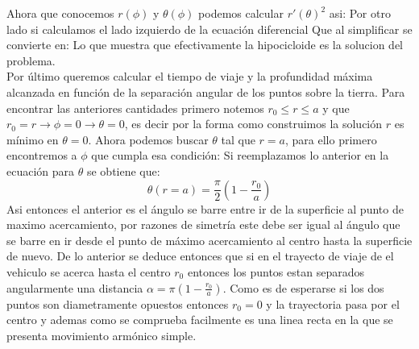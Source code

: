 Ahora que conocemos $r(\phi)$ y $\theta(\phi)$ podemos calcular $r'(\theta)^2$ asi:
Por otro lado si calculamos el lado izquierdo de la ecuaci\'on diferencial 
Que al simplificar se convierte en:
Lo que muestra que efectivamente la hipocicloide es la solucion del problema.
\\
Por \'ultimo queremos calcular el tiempo de viaje y la profundidad m\'axima alcanzada en funci\'on de la separaci\'on angular de los puntos sobre la tierra.
Para encontrar las anteriores cantidades primero notemos $r_0\leq r\leq a$ y que $r_0=r \rightarrow \phi=0 \rightarrow \theta=0$, es decir por la forma como construimos la soluci\'on $r$ es m\'inimo en $\theta=0$. Ahora podemos buscar $\theta$ tal que $r=a$, para ello primero encontremos  a $\phi$ que cumpla esa condici\'on:
Si reemplazamos lo anterior en la ecuaci\'on para $\theta$ se obtiene que:
$$\theta(r=a)=\frac{\pi}{2}\left(1-\frac{r_0}{a}\right)$$
Asi entonces el anterior es el \'angulo se barre entre ir de la superficie al punto de maximo acercamiento, por razones de simetr\'ia este debe ser igual al \'angulo que se barre en ir desde el punto de m\'aximo acercamiento al centro hasta la superficie de nuevo. De lo anterior se deduce entonces que si en el trayecto de viaje de el vehiculo se acerca hasta el centro $r_0$ entonces los puntos estan separados angularmente una distancia $\alpha=\pi \left(1-\frac{r_0}{a}\right)$. Como es de esperarse si los dos puntos son diametramente opuestos entonces $r_0=0$ y la trayectoria pasa por el centro y ademas como se comprueba facilmente es una linea recta en la que se presenta movimiento arm\'onico simple.\\
